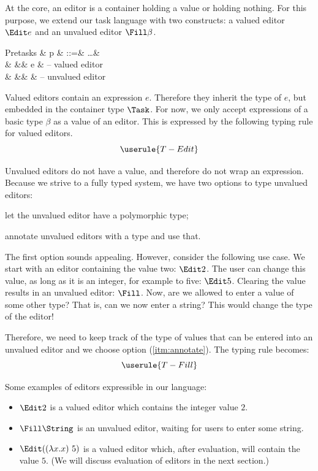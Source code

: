 At the core,
an editor is a container holding a value
or holding nothing.
For this purpose, we extend our task language with two constructs:
a valued editor $\Edit e$ and an unvalued editor $\Fill \beta$.
\begin{grammar}
  Pretasks
    & p & ::=& \ldots      & \\
    &   &\mid& \Edit e     & – valued editor \\
    &   &\mid& \Fill \beta & – unvalued editor \\
\end{grammar}

Valued editors contain an expression $e$.
Therefore they inherit the type of $e$,
but embedded in the container type $\Task$.
For now, we only accept expressions of a basic type $\beta$ as a value of an editor.
This is expressed by the following typing rule for valued editors.
\begin{equation*}
  \userule{T-Edit}
\end{equation*}

Unvalued editors do not have a value,
and therefore do not wrap an expression.
Because we strive to a fully typed system,
we have two options to type unvalued editors:
\begin{enumerate*}
  \item let the unvalued editor have a polymorphic type;
  \item annotate unvalued editors with a type and use that. \label{itm:annotate}
\end{enumerate*}

The first option sounds appealing.
However, consider the following use case.
We start with an editor containing the value two: $\Edit 2$.
The user can change this value, as long as it is an integer,
for example to five: $\Edit 5$.
Clearing the value results in an unvalued editor: $\Fill$.
Now, are we allowed to enter a value of some other type?
That is, can we now enter a string?
This would change the type of the editor!

Therefore,
we need to keep track of the type of values that can be entered into an unvalued editor
and we choose option (\ref{itm:annotate}).
The typing rule becomes:
\begin{equation*}
  \userule{T-Fill}
\end{equation*}

Some examples of editors expressible in our language:
\begin{itemize}
  \item $\Edit 2$ is a valued editor which contains the integer value $2$.
  \item $\Fill \String$ is an unvalued editor,
    waiting for users to enter some string.
  \item $\Edit ((\lambda x . x)\ 5)$ is a valued editor which,
    after evaluation, will contain the value $5$.
    (We will discuss evaluation of editors in the next section.)
\end{itemize}


